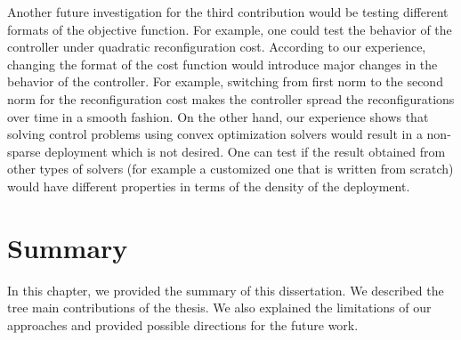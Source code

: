 Another future investigation for the third contribution would be testing different formats of the objective function. For example, one could test the behavior of the controller under quadratic reconfiguration cost. According to our experience, changing the format of the cost function would introduce major changes in the behavior of the controller. For example, switching from first norm to the second norm for the reconfiguration cost makes the controller
spread the reconfigurations over time in a smooth fashion. On the other hand, our experience shows that solving control problems using convex optimization solvers would result in a non-sparse deployment which is not desired. One can test if the result obtained from other types of solvers (for example a customized one that is written from scratch) would have different properties in terms of the density of the deployment. 

\section{Summary} 
\label{sec:summary_summary}
 In this chapter, we provided the summary of this dissertation. We described the tree main contributions of the thesis. We also explained the limitations of our approaches and provided possible directions for the future work.

